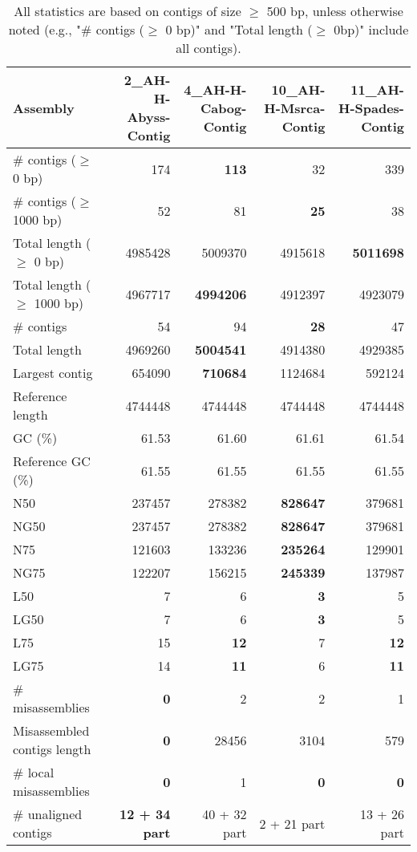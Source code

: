 \documentclass[12pt,a4paper]{article}
\begin{document}
\begin{table}[ht]
\begin{center}
\caption{All statistics are based on contigs of size $\geq$ 500 bp, unless otherwise noted (e.g., "\# contigs ($\geq$ 0 bp)" and "Total length ($\geq$ 0bp)" include all contigs).}
\begin{tabular}{|l*{4}{|r}|}
\hline
Assembly & 2\_AH-H-Abyss-Contig & 4\_AH-H-Cabog-Contig & 10\_AH-H-Msrca-Contig & 11\_AH-H-Spades-Contig \\ \hline
\# contigs ($\geq$ 0 bp) & 174 & {\bf 113} & 32 & 339 \\ \hline
\# contigs ($\geq$ 1000 bp) & 52 & 81 & {\bf 25} & 38 \\ \hline
Total length ($\geq$ 0 bp) & 4985428 & 5009370 & 4915618 & {\bf 5011698} \\ \hline
Total length ($\geq$ 1000 bp) & 4967717 & {\bf 4994206} & 4912397 & 4923079 \\ \hline
\# contigs & 54 & 94 & {\bf 28} & 47 \\ \hline
Total length & 4969260 & {\bf 5004541} & 4914380 & 4929385 \\ \hline
Largest contig & 654090 & {\bf 710684} & 1124684 & 592124 \\ \hline
Reference length & 4744448 & 4744448 & 4744448 & 4744448 \\ \hline
GC (\%) & 61.53 & 61.60 & 61.61 & 61.54 \\ \hline
Reference GC (\%) & 61.55 & 61.55 & 61.55 & 61.55 \\ \hline
N50 & 237457 & 278382 & {\bf 828647} & 379681 \\ \hline
NG50 & 237457 & 278382 & {\bf 828647} & 379681 \\ \hline
N75 & 121603 & 133236 & {\bf 235264} & 129901 \\ \hline
NG75 & 122207 & 156215 & {\bf 245339} & 137987 \\ \hline
L50 & 7 & 6 & {\bf 3} & 5 \\ \hline
LG50 & 7 & 6 & {\bf 3} & 5 \\ \hline
L75 & 15 & {\bf 12} & 7 & {\bf 12} \\ \hline
LG75 & 14 & {\bf 11} & 6 & {\bf 11} \\ \hline
\# misassemblies & {\bf 0} & 2 & 2 & 1 \\ \hline
Misassembled contigs length & {\bf 0} & 28456 & 3104 & 579 \\ \hline
\# local misassemblies & {\bf 0} & 1 & {\bf 0} & {\bf 0} \\ \hline
\# unaligned contigs & {\bf 12 + 34 part} & 40 + 32 part & 2 + 21 part & 13 + 26 part \\ \hline

\end{tabular}
\end{center}
\end{table}
\end{document}
